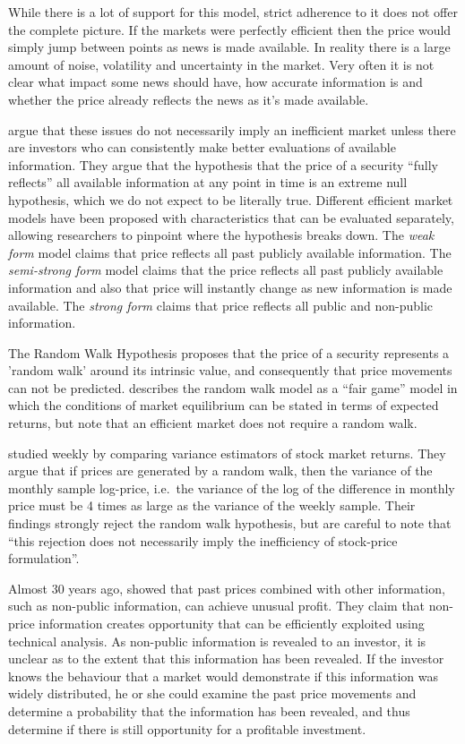 \documentclass{article}
\theoremstyle{definition}
\begin{document}
While there is a lot of support for this model, strict adherence to it does not offer the complete picture. If the markets were perfectly efficient then the price would simply jump between points as news is made available. In reality there is a large amount of noise, volatility and uncertainty in the market. Very often it is not clear what impact some news should have, how accurate information is and whether the price already reflects the news as it's made available.

\cite{malkiel1970efficient} argue that these issues do not necessarily imply an inefficient market unless there are investors who can consistently make better evaluations of available information. They argue that the hypothesis that the price of a security ``fully reflects'' all available information at any point in time is an extreme null hypothesis, which we do not expect to be literally true. Different efficient market models have been proposed with characteristics that can be evaluated separately, allowing researchers to pinpoint where the hypothesis breaks down. The \textit{weak form} model claims that price reflects all past publicly available information. The \textit{semi-strong form} model claims that the price reflects all past publicly available information and also that price will instantly change as new information is made available. The \textit{strong form} claims that price reflects all public and non-public information.

The Random Walk Hypothesis proposes that the price of a security represents a 'random walk' around its intrinsic value, and consequently that price movements can not be predicted. \cite{malkiel1970efficient} describes the random walk model as a ``fair game'' model in which the conditions of market equilibrium can be stated in terms of expected returns, but note that an efficient market does not require a random walk. 

\cite{lo1988} studied weekly by comparing variance estimators of stock market returns. They argue that if prices are generated by a random walk, then the variance of the monthly sample log-price, i.e.\ the variance of the log of the difference in monthly price must be 4 times as large as the variance of the weekly sample. Their findings strongly reject the random walk hypothesis, but are careful to note that ``this rejection does not necessarily imply the inefficiency of stock-price formulation''.

Almost 30 years ago, \cite{indefenseof} showed that past prices combined with other information, such as non-public information, can achieve unusual profit. They claim that non-price information creates opportunity that can be efficiently exploited using technical analysis. As non-public information is revealed to an investor, it is unclear as to the extent that this information has been revealed. If the investor knows the behaviour that a market would demonstrate if this information was widely distributed, he or she could examine the past price movements and determine a probability that the information has been revealed, and thus determine if there is still opportunity for a profitable investment.
\end{document}
